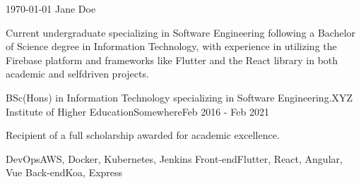 \documentclass[11pt, a4paper]{awesome-cv}
\begin{document}
\makecvheader[C]

\makecvfooter
  {\today}
  {Jane Doe}
  {\thepage}


        \begin{cvparagraph}

        Current undergraduate specializing in Software Engineering following a Bachelor of Science degree in Information Technology, with experience in utilizing the Firebase platform and frameworks like Flutter and the React library in both academic and selfdriven projects.
        \end{cvparagraph}

        

        \begin{cventries}

        
                  \cventry
                {BSc(Hons) in Information Technology specializing in Software Engineering.}{XYZ Institute of Higher Education}{Somewhere}{Feb 2016 - Feb 2021}
                        {
                          \begin{cvitems}
                            \item{Recipient of a full scholarship awarded for academic excellence.}
                          \end{cvitems}
                        }
        \end{cventries}

        

        \begin{cvskills}

        
                  \cvskill
                {DevOps}{AWS, Docker, Kubernetes, Jenkins}
                  \cvskill
                {Front-end}{Flutter, React, Angular, Vue}
                  \cvskill
                {Back-end}{Koa, Express}
        \end{cvskills}

        
\end{document}
